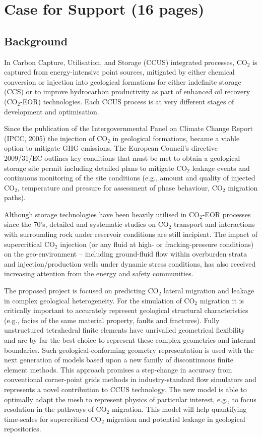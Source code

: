 \documentclass[12pts,a4paper,amsmath,amssymb,floatfix]{article}%
\newcommand{\CO}{CO\ensuremath{_{2}}}
\begin{document}
\clearpage

\section{Case for Support (16 pages)}

\subsection{Background}

In Carbon Capture, Utilisation, and Storage (CCUS) integrated processes, \CO\; is captured from energy-intensive point sources, mitigated by either chemical conversion or injection into geological formations for either indefinite storage (CCS) or to improve hydrocarbon productivity as part of enhanced oil recovery (\CO-EOR) technologies. Each CCUS process is at very different stages of development and optimisation. 

Since the publication of the Intergovernmental Panel on Climate Change Report (IPCC, 2005) the injection of \CO\; in geological formations, became a viable option to mitigate GHG emissions. The European Council's directive 2009/31/EC outlines key conditions that must be met to obtain a geological storage site permit including detailed plans to mitigate \CO\; leakage events and continuous monitoring of the site conditions (e.g., amount and quality of injected \CO, temperature and pressure for assessment of phase behaviour, \CO\; migration paths).

Although storage technologies have been heavily utilised in \CO-EOR processes since the 70's, detailed and systematic studies on \CO\; transport and interactions with surrounding rock under reservoir conditions are still incipient. The impact of supercritical \CO\; injection (or any fluid at high- or fracking-pressure conditions) on the geo-environment -- including ground-fluid flow within overburden strata and injection/production wells under dynamic stress conditions, has also received increasing attention from the energy and safety communities.

The proposed project is focused on predicting \CO\; lateral migration and leakage in complex geological heterogeneity. For the simulation of \CO\; migration it is critically important to accurately represent geological structural characteristics (e.g., facies of the same material property, faults and fractures).  Fully unstructured tetrahedral finite elements have unrivalled geometrical flexibility and are by far the best choice to represent these complex geometries and internal boundaries. Such geological-conforming geometry representation is used with the next generation of models based upon a new family of discontinuous finite element methods. This approach promises a step-change in accuracy from conventional corner-point grids methods in industry-standard flow simulators and represents a novel contribution to CCUS technology. The new model is able to optimally adapt the mesh to represent physics of particular interest, e.g., to focus resolution in the pathways of \CO\; migration.  This model will help quantifying time-scales for supercritical \CO\; migration and potential leakage in geological repositories. 
\end{document}
